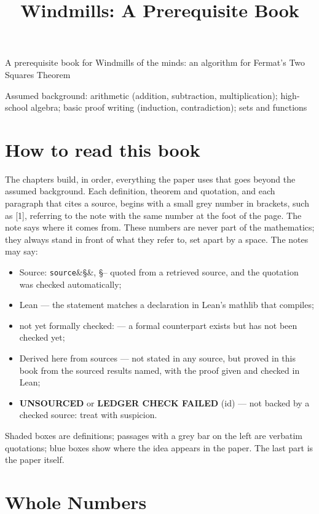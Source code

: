 \documentclass[11pt,letterpaper,openright]{book}
\title{Windmills: A Prerequisite Book}
\newcommand{\srcok}[3]{\textcolor{srcgray}{\textsf{Source:} \texttt{#1}\ifx&#2&\else, #2\fi}}
\newcommand{\srcbad}[1]{\textcolor{unsourced}{\textbf{\textsf{LEDGER CHECK FAILED}} (#1)}}
\newcommand{\unsourced}{\textcolor{unsourced}{\textbf{\textsf{UNSOURCED}}}}
\newcommand{\leanok}[1]{\textcolor{leangreen}{\textsf{Lean \checkmk} \texttt{\detokenize{#1}}}}
\newcommand{\leanpending}[1]{\textcolor{srcgray}{\textsf{not yet formally checked:} \texttt{\detokenize{#1}}}}
\newcommand{\derivedtag}[1]{\textcolor{srcgray}{\textsf{Derived here} from #1}}
\theoremstyle{plain}
\theoremstyle{definition}
\theoremstyle{remark}
\begin{document}
\frontmatter
\begin{titlepage}\centering
\vspace*{2in}{\Huge Windmills: A Prerequisite Book\par}\vspace{0.4in}
{\Large A prerequisite book for Windmills of the minds: an algorithm for Fermat's Two Squares Theorem\par}\vspace{0.2in}{\large Hing Lun Chan\par}
\vfill{\small Assumed background: arithmetic (addition, subtraction, multiplication); high-school algebra; basic proof writing (induction, contradiction); sets and functions\par}
\end{titlepage}
\tableofcontents
\chapter*{How to read this book}
The chapters build, in order, everything the paper uses that goes beyond the assumed background.
Each definition, theorem and quotation, and each paragraph that cites a source, begins with a
small grey number in brackets, such as \textcolor{srcgray}{\footnotesize[1]}, referring to the note
with the same number at the foot of the page. The note says where it comes from. These numbers
are never part of the mathematics; they always stand in front of what they refer to, set apart by
a space. The notes may say:
\begin{itemize}
\item \srcok{source}{§} --- quoted from a retrieved source, and the quotation was checked automatically;
\item \leanok{name} --- the statement matches a declaration in Lean's mathlib that compiles;
\item \leanpending{name} --- a formal counterpart exists but has not been checked yet;
\item \derivedtag{sources} --- not stated in any source, but proved in this book from the sourced results named, with the proof given and checked in Lean;
\item \unsourced{} or \srcbad{id} --- not backed by a checked source: treat with suspicion.
\end{itemize}
Shaded boxes are definitions; passages with a grey bar on the left are verbatim quotations;
blue boxes show where the idea appears in the paper. The last part is the paper itself.
\mainmatter
\hypertarget{whole-numbers}{%
\chapter{Whole Numbers}\label{whole-numbers}}
\end{document}
